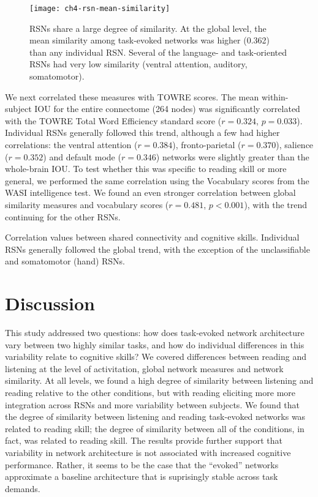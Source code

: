 \begin{figure}[t!]
	\centering
	\texttt{[image: ch4-rsn-mean-similarity]}
    \caption[RSNs share a large degree of similarity]{RSNs share a large degree of similarity. At the global level, the mean similarity among task-evoked networks was higher (0.362) than any individual RSN. Several of the language- and task-oriented RSNs had very low similarity (ventral attention, auditory, somatomotor).}
	\label{fig:ch4-rsn-mean-similarity}
\end{figure}

We next correlated these measures with TOWRE scores. The mean within-subject IOU for the entire connectome (264 nodes) was significantly correlated with the TOWRE Total Word Efficiency standard score ($r = 0.324$, $p = 0.033$). Individual RSNs generally followed this trend, although a few had higher correlations: the ventral attention ($r=0.384$), fronto-parietal ($r=0.370$), salience ($r=0.352$) and default mode ($r=0.346$) networks were slightly greater than the whole-brain IOU. To test whether this was specific to reading skill or more general, we performed the same correlation using the Vocabulary scores from the WASI intelligence test. We found an even stronger correlation between global similarity measures and vocabulary scores ($r = 0.481$, $p < 0.001$), with the trend continuing for the other RSNs. 

\begin{table}[t!]
	\renewcommand{\tabcolsep}{0.09cm}
	\centering
	
	\caption[Correlation values between shared connectivity and cognitive skill]{Correlation values between shared connectivity and cognitive skills. Individual RSNs generally followed the global trend, with the exception of the unclassifiable and somatomotor (hand) RSNs.}
	\label{table:ch4-rsn-similarity-to-reading}
\end{table}

\section{Discussion}

This study addressed two questions: how does task-evoked network architecture vary between two highly similar tasks, and how do individual differences in this variability relate to cognitive skills? We covered differences between reading and listening at the level of activitation, global network measures and network similarity. At all levels, we found a high degree of similarity between listening and reading relative to the other conditions, but with reading eliciting more more integration across RSNs and more variability between subjects. We found that the degree of similarity between listening and reading task-evoked networks was related to reading skill; the degree of similarity between all of the conditions, in fact, was related to reading skill. The results provide further support that variability in network architecture is not associated with increased cognitive performance. Rather, it seems to be the case that the ``evoked'' networks approximate a baseline architecture that is suprisingly stable across task demands.

